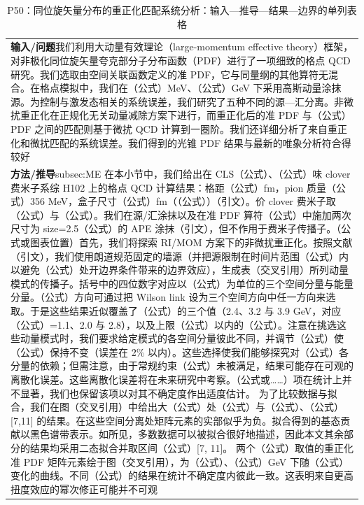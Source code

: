 \documentclass[UTF8,11pt,oneside]{ctexbook}
\begin{document}
\begin{table}[htbp]
  \centering
  \caption*{P50：同位旋矢量分布的重正化匹配系统分析：输入—推导—结果—边界的单列表格}
  \small
  \begin{tabular}{@{}p{}@{}}
    \toprule
    \textbf{输入/问题}\quad 我们利用大动量有效理论（large-momentum effective theory）框架，对非极化同位旋矢量夸克部分子分布函数（PDF）进行了一项细致的格点 QCD 研究。我们选取由空间关联函数定义的准 PDF，它与同量纲的其他算符无混合。在格点模拟中，我们在（公式）MeV、（公式）GeV 下采用高斯动量涂抹源。为控制与激发态相关的系统误差，我们研究了五种不同的源—汇分离。非微扰重正化在正规化无关动量减除方案下进行，而重正化后的准 PDF 与（公式）PDF 之间的匹配则基于微扰 QCD 计算到一圈阶。我们还详细分析了来自重正化和微扰匹配的系统误差。我们得到的光锥 PDF 结果与最新的唯象分析符合得较好 \\
    \textbf{方法/推导}\quad subsec:ME 在本小节中，我们给出在 CLS（公式）、（公式）味 clover 费米子系综 H102 上的格点 QCD 计算结果：格距（公式）fm，pion 质量（公式）356 MeV，盒子尺寸（公式）fm（（公式））（引文）。价 clover 费米子取（公式）与（公式）。我们在源/汇涂抹以及在准 PDF 算符（公式）中施加两次尺寸为 size=2.5（公式）的 APE 涂抹（引文），但不作用于费米子传播子。（公式或图表位置）首先，我们将探索 RI/MOM 方案下的非微扰重正化。按照文献（引文），我们使用朗道规范固定的墙源（并把源限制在时间片范围（公式）内以避免（公式）处开边界条件带来的边界效应），生成表（交叉引用）所列动量模式的传播子。括号中的四位数字对应以（公式）为单位的三个空间分量与能量分量。（公式）方向可通过把 Wilson link 设为三个空间方向中任一方向来选取。于是这些结果近似覆盖了（公式）的三个值（2.4、3.2 与 3.9 GeV，对应（公式）=1.1、2.0 与 2.8），以及上限（公式）以内的（公式）。注意在挑选这些动量模式时，我们要求给定模式的各空间分量彼此不同，并调节（公式）使（公式）保持不变（误差在 2\% 以内）。这些选择使我们能够探究对（公式）各分量的依赖；但需注意，由于常规约束（公式）未被满足，结果可能存在可观的离散化误差。这些离散化误差将在未来研究中考察。（公式或……）项在统计上并不显著，我们也保留该项以对其不确定度作出适度估计。 为了比较数据与拟合，我们在图（交叉引用）中给出大（公式）处（公式）与（公式）、（公式）[7,11] 的结果。在这些空间分离处矩阵元素的实部似乎为负。拟合得到的基态贡献以黑色谱带表示。如所见，多数数据可以被拟合很好地描述，因此本文其余部分的结果均采用二态拟合并取区间（公式）[7, 11]。 两个（公式）取值的重正化准 PDF 矩阵元素绘于图（交叉引用），为（公式）、（公式）GeV 下随（公式）变化的曲线。不同（公式）的结果在统计不确定度内彼此一致。这表明来自更高扭度效应的幂次修正可能并不可观 \\

\end{tabular}
\end{table}
\end{document}
